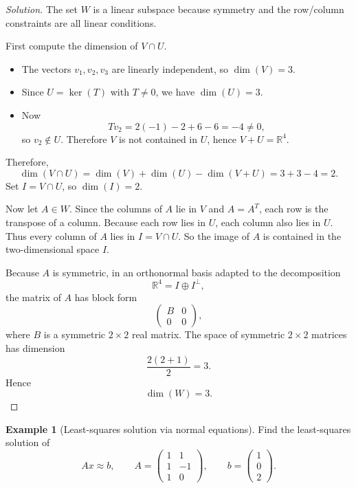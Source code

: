 \documentclass[11pt]{article}
\theoremstyle{definition}
\newtheorem{example}{Example}[section]
\newcommand{\R}{\mathbb{R}}
\begin{document}
\begin{proof}[Solution]
The set $W$ is a linear subspace because symmetry and the row/column constraints are all linear conditions.

First compute the dimension of $V\cap U$.
\begin{itemize}
    \item The vectors $v_1,v_2,v_3$ are linearly independent, so $\dim(V)=3$.
    \item Since $U=\ker(T)$ with $T\neq 0$, we have $\dim(U)=3$.
    \item Now
    \[
        Tv_2 = 2(-1)-2+6-6 = -4 \neq 0,
    \]
    so $v_2\notin U$. Therefore $V$ is not contained in $U$, hence $V+U=\R^4$.
\end{itemize}
Therefore,
\[
\dim(V\cap U)=\dim(V)+\dim(U)-\dim(V+U)=3+3-4=2.
\]
Set $I=V\cap U$, so $\dim(I)=2$.

Now let $A\in W$. Since the columns of $A$ lie in $V$ and $A=A^T$, each row is the transpose of a column. Because each row lies in $U$, each column also lies in $U$. Thus every column of $A$ lies in $I=V\cap U$. So the image of $A$ is contained in the two-dimensional space $I$.

Because $A$ is symmetric, in an orthonormal basis adapted to the decomposition
\[
\R^4 = I \oplus I^\perp,
\]
the matrix of $A$ has block form
\[
\begin{pmatrix}
B & 0 \\
0 & 0
\end{pmatrix},
\]
where $B$ is a symmetric $2\times 2$ real matrix. The space of symmetric $2\times 2$ matrices has dimension
\[
\frac{2(2+1)}{2}=3.
\]
Hence
\[
\boxed{\dim(W)=3}.
\]
\end{proof}

\begin{example}[Least-squares solution via normal equations]
Find the least-squares solution of
\[
A x \approx b,
\qquad
A=
\begin{pmatrix}
1&1\\
1&-1\\
1&0
\end{pmatrix},
\qquad
b=
\begin{pmatrix}
1\\
0\\
2
\end{pmatrix}.
\]
\end{example}
\end{document}
